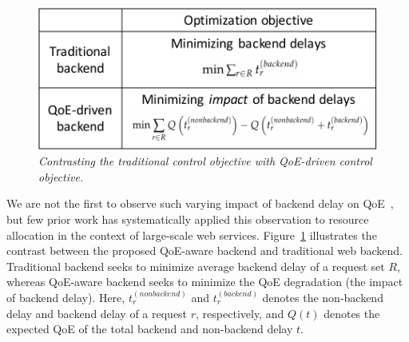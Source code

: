 \begin{figure}
	\centering
	\vspace{-0.3cm}
	\includegraphics[width=1.0\textwidth]{figs/objective-contrast.pdf}
	\caption{\em Contrasting the traditional control objective with QoE-driven control objective.}
	\label{fig:objective-contrast}
\end{figure}
We are not the first to observe such varying impact of backend delay on QoE~\cite{timecard,dqbarge,balachandran2014modeling}, but few prior work has systematically applied this observation to resource allocation in the context of large-scale web services. 
Figure~\ref{fig:objective-contrast} illustrates the contrast between the proposed QoE-aware backend and traditional web backend.
Traditional backend seeks to minimize average backend delay of a request set $R$,
whereas QoE-aware backend seeks to minimize the QoE degradation (\ie the impact of backend delay).
Here, $t_{r}^{(nonbackend)}$ and $t_{r}^{(backend)}$ denotes the non-backend delay and backend delay of a request $r$, respectively, and $Q(t)$ denotes the expected QoE of the total backend and non-backend delay $t$.

